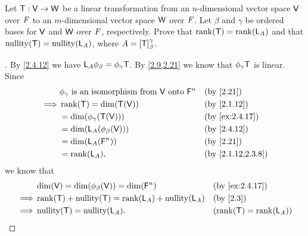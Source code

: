 \setcounter{ex}{19}
\begin{ex}\label{ex:2.4.20}
  Let \(\mathsf{T} : \mathsf{V} \to \mathsf{W}\) be a linear transformation from an \(n\)-dimensional vector space \(\mathsf{V}\) over \(\mathit{F}\) to an \(m\)-dimensional vector space \(\mathsf{W}\) over \(\mathit{F}\).
  Let \(\beta\) and \(\gamma\) be ordered bases for \(\mathsf{V}\) and \(\mathsf{W}\) over \(\mathit{F}\), respectively.
  Prove that \(\rk{\T} = \rk{\L_A}\) and that \(\nt{\T} = \nt{\L_A}\), where \(A = [\mathsf{T}]_{\beta}^{\gamma}\).
\end{ex}

\begin{proof}[]
  By \cref{2.4.12} we have \(\mathsf{L}_A \phi_{\beta} = \phi_{\gamma} \mathsf{T}\).
  By \cref{2.9,2.21} we know that \(\phi_{\gamma} \mathsf{T}\) is linear.
  Since
  \begin{align*}
             & \phi_{\gamma} \text{ is an isomorphism from } \V \text{ onto } \vs{F}^n &  & \text{(by \cref{2.21})}         \\
    \implies & \rk{\T} = \dim(\T(\V))                                                  &  & \text{(by \cref{2.1.12})}       \\
             & = \dim(\phi_{\gamma}(\T(\V)))                                           &  & \text{(by \cref{ex:2.4.17})}    \\
             & = \dim(\L_A(\phi_{\beta}(\V)))                                          &  & \text{(by \cref{2.4.12})}       \\
             & = \dim(\L_A(\vs{F}^n))                                                  &  & \text{(by \cref{2.21})}         \\
             & = \rk{\L_A},                                                            &  & \text{(by \cref{2.1.12,2.3.8})}
  \end{align*}
  we know that
  \begin{align*}
             & \dim(\V) = \dim(\phi_{\beta}(\V)) = \dim(\vs{F}^n) &  & \text{(by \cref{ex:2.4.17})} \\
    \implies & \rk{\T} + \nt{\T} = \rk{\L_A} + \nt{\L_A}          &  & \text{(by \cref{2.3})}       \\
    \implies & \nt{\T} = \nt{\L_A}.                               &  & (\rk{\T} = \rk{\L_A})
  \end{align*}
\end{proof}

